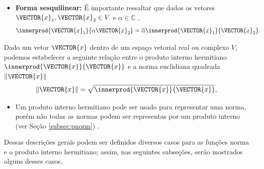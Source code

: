 \begin{tcbattention}
\begin{itemize}
\item \textbf{Forma sesquilinear:} 
É importante ressaltar que dados os vetores $\VECTOR{x}_1,\VECTOR{x}_2 \in V$ 
 e $\alpha \in \mathbb{C}$ \cite[pp. 242]{damiano2011course},
\begin{equation}
\innerprod{ \VECTOR{x}_1}{\alpha \VECTOR{x}_2} =\overline{\alpha} \innerprod{\VECTOR{x}_1}{\VECTOR{x}_2}.
\end{equation}

\end{itemize}
\end{tcbattention}

\begin{definition}
Dado um vetor $\VECTOR{x}$ dentro de um espaço vetorial real ou complexo $V$,
podemos estabelecer a seguinte relação entre o 
produto interno hermitiano $\innerprod{\VECTOR{x}}{\VECTOR{x}}$ e 
a norma euclidiana quadrada $\|\VECTOR{x}\|$ 
\cite[pp. 44]{d2019hermitian}  \cite[pp. 242]{damiano2011course}
\begin{equation}
\|\VECTOR{x}\|=\sqrt{\innerprod{\VECTOR{x}}{\VECTOR{x}}},
\end{equation} 
\end{definition}

\begin{tcbattention}
\begin{itemize}
\item Um produto interno hermitiano pode ser usado para representar uma norma,
porém não todas as normas podem ser representas por um produto interno 
(ver Seção \ref{subsec:pnorm}) \cite[pp. 45]{d2019hermitian}.
\end{itemize}
\end{tcbattention}

Dessas descrições gerais podem ser definidos diversos casos para as funções
norma e o produto interno hermitiano; assim, 
nas seguintes subseções, serão mostrados alguns desses casos.

